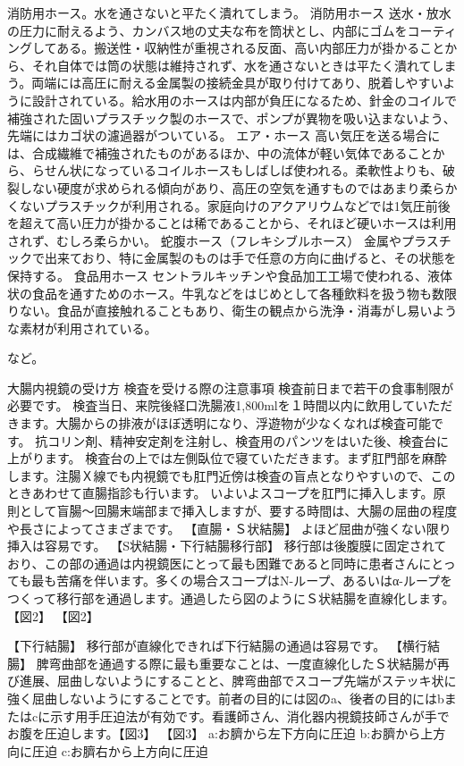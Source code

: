 消防用ホース。水を通さないと平たく潰れてしまう。
消防用ホース 
送水・放水の圧力に耐えるよう、カンバス地の丈夫な布を筒状とし、内部にゴムをコーティングしてある。搬送性・収納性が重視される反面、高い内部圧力が掛かることから、それ自体では筒の状態は維持されず、水を通さないときは平たく潰れてしまう。両端には高圧に耐える金属製の接続金具が取り付けてあり、脱着しやすいように設計されている。給水用のホースは内部が負圧になるため、針金のコイルで補強された固いプラスチック製のホースで、ポンプが異物を吸い込まないよう、先端にはカゴ状の濾過器がついている。
エア・ホース 
高い気圧を送る場合には、合成繊維で補強されたものがあるほか、中の流体が軽い気体であることから、らせん状になっているコイルホースもしばしば使われる。柔軟性よりも、破裂しない硬度が求められる傾向があり、高圧の空気を通すものではあまり柔らかくないプラスチックが利用される。家庭向けのアクアリウムなどでは1気圧前後を超えて高い圧力が掛かることは稀であることから、それほど硬いホースは利用されず、むしろ柔らかい。
蛇腹ホース（フレキシブルホース） 
金属やプラスチックで出来ており、特に金属製のものは手で任意の方向に曲げると、その状態を保持する。
食品用ホース 
セントラルキッチンや食品加工工場で使われる、液体状の食品を通すためのホース。牛乳などをはじめとして各種飲料を扱う物も数限りない。食品が直接触れることもあり、衛生の観点から洗浄・消毒がし易いような素材が利用されている。

など。





大腸内視鏡の受け方
検査を受ける際の注意事項
検査前日まで若干の食事制限が必要です。
検査当日、来院後経口洗腸液1,800mlを１時間以内に飲用していただきます。大腸からの排液がほぼ透明になり、浮遊物が少なくなれば検査可能です。
抗コリン剤、精神安定剤を注射し、検査用のパンツをはいた後、検査台に上がります。
検査台の上では左側臥位で寝ていただきます。まず肛門部を麻酔します。注腸Ｘ線でも内視鏡でも肛門近傍は検査の盲点となりやすいので、このときあわせて直腸指診も行います。
いよいよスコープを肛門に挿入します。原則として盲腸～回腸末端部まで挿入しますが、要する時間は、大腸の屈曲の程度や長さによってさまざまです。 
【直腸・Ｓ状結腸】
よほど屈曲が強くない限り挿入は容易です。
【S状結腸・下行結腸移行部】
移行部は後腹膜に固定されており、この部の通過は内視鏡医にとって最も困難であると同時に患者さんにとっても最も苦痛を伴います。多くの場合スコープはN-ループ、あるいはα-ループをつくって移行部を通過します。通過したら図のようにＳ状結腸を直線化します。【図2】
【図2】

【下行結腸】
移行部が直線化できれば下行結腸の通過は容易です。
【横行結腸】
脾弯曲部を通過する際に最も重要なことは、一度直線化したＳ状結腸が再び進展、屈曲しないようにすることと、脾弯曲部でスコープ先端がステッキ状に強く屈曲しないようにすることです。前者の目的には図のa、後者の目的にはbまたはcに示す用手圧迫法が有効です。看護師さん、消化器内視鏡技師さんが手でお腹を圧迫します。【図3】
【図3】
a:お臍から左下方向に圧迫
b:お臍から上方向に圧迫
c:お臍右から上方向に圧迫
 
